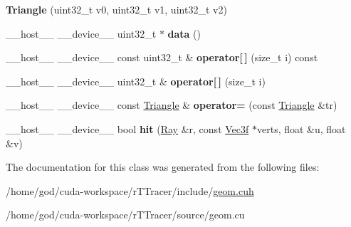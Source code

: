 \begin{DoxyCompactItemize}
\item 
{\bfseries Triangle} (uint32\+\_\+t v0, uint32\+\_\+t v1, uint32\+\_\+t v2)\hypertarget{class_triangle_a8532ce36a26abc9ab0064533ee880b67}{}\label{class_triangle_a8532ce36a26abc9ab0064533ee880b67}

\item 
\+\_\+\+\_\+host\+\_\+\+\_\+ \+\_\+\+\_\+device\+\_\+\+\_\+ uint32\+\_\+t $\ast$ {\bfseries data} ()\hypertarget{class_triangle_a2eea9accac4d5b5c15bfea78a4cb9c70}{}\label{class_triangle_a2eea9accac4d5b5c15bfea78a4cb9c70}

\item 
\+\_\+\+\_\+host\+\_\+\+\_\+ \+\_\+\+\_\+device\+\_\+\+\_\+ const uint32\+\_\+t \& {\bfseries operator\mbox{[}$\,$\mbox{]}} (size\+\_\+t i) const\hypertarget{class_triangle_a57dd18e35b07c652eed774496e5df90c}{}\label{class_triangle_a57dd18e35b07c652eed774496e5df90c}

\item 
\+\_\+\+\_\+host\+\_\+\+\_\+ \+\_\+\+\_\+device\+\_\+\+\_\+ uint32\+\_\+t \& {\bfseries operator\mbox{[}$\,$\mbox{]}} (size\+\_\+t i)\hypertarget{class_triangle_af236d7da54e116769d37e784027d5cae}{}\label{class_triangle_af236d7da54e116769d37e784027d5cae}

\item 
\+\_\+\+\_\+host\+\_\+\+\_\+ \+\_\+\+\_\+device\+\_\+\+\_\+ const \hyperlink{class_triangle}{Triangle} \& {\bfseries operator=} (const \hyperlink{class_triangle}{Triangle} \&tr)\hypertarget{class_triangle_ab606bdee8d1a07157243e14a7427396a}{}\label{class_triangle_ab606bdee8d1a07157243e14a7427396a}

\item 
\+\_\+\+\_\+host\+\_\+\+\_\+ \+\_\+\+\_\+device\+\_\+\+\_\+ bool {\bfseries hit} (\hyperlink{class_ray}{Ray} \&r, const \hyperlink{class_vec3}{Vec3f} $\ast$verts, float \&u, float \&v)\hypertarget{class_triangle_a853b6db440f108fe7581e2fc8a90bdc9}{}\label{class_triangle_a853b6db440f108fe7581e2fc8a90bdc9}

\end{DoxyCompactItemize}


The documentation for this class was generated from the following files\+:\begin{DoxyCompactItemize}
\item 
/home/god/cuda-\/workspace/r\+T\+Tracer/include/\hyperlink{r_t_tracer_2include_2geom_8cuh}{geom.\+cuh}\item 
/home/god/cuda-\/workspace/r\+T\+Tracer/source/geom.\+cu\end{DoxyCompactItemize}
